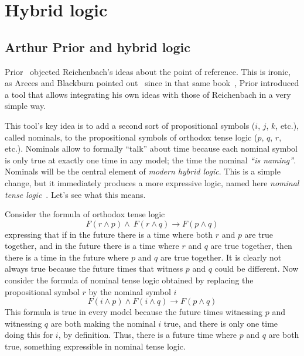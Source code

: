 \section{Hybrid logic}

\subsection{Arthur Prior and hybrid logic}

Prior~\cite{Prior1967} objected Reichenbach's ideas about the point of
reference. This is ironic, as Areces and Blackburn pointed 
out~\cite{ArecesBlackburn2005} since in that same book~\cite{Prior1967}, Prior introduced
a tool that allows integrating his own ideas with those of Reichenbach in a
very simple way.

This tool's key idea is to add a second sort of propositional symbols ($i$, $%
j$, $k$, etc.), called nominals, to the propositional symbols of orthodox
tense logic ($p$, $q$, $r$, etc.). Nominals allow to formally ``talk'' about
time because each nominal symbol is only true at exactly one time in any
model; the time the nominal \emph{``is naming''}. Nominals will be the central
element of \emph{modern hybrid logic}. This is a simple change, but it
immediately produces a more expressive logic, named here \emph{nominal tense
logic}~\cite{Blackburn1994}. Let's see what this means.

Consider the formula of orthodox tense logic
$$
F(r\wedge p)\wedge \ F(r\wedge q)\rightarrow F(p\wedge q)
$$
expressing that if in the future there is a time where both $r$ and $p$ are
true together, and in the future there is a time where $r$ and $q$ are true
together, then there is a time in the future where $p$ and $q$ are true
together. It is clearly not always true because the future times that
witness $p$ and $q$ could be different. Now consider the formula of nominal
tense logic obtained by replacing the propositional symbol $r$ by the nominal
symbol $i$ 
$$
F(i\wedge p)\wedge F(i\wedge q)\rightarrow F(p\wedge q)
$$
This formula is true in every model because the future times witnessing $p$
and witnessing $q$ are both making the nominal $i$ true, and there is only
one time doing this for $i$, by definition. Thus, there is a future time
where $p$ and $q$ are both true, something expressible in nominal tense
logic.

